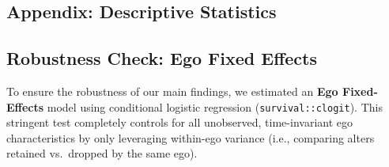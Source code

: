 \documentclass[
  letterpaper,
  DIV=11,
  numbers=noendperiod]{scrartcl}
\begin{document}
\subsection{Appendix: Descriptive
Statistics}\label{appendix-descriptive-statistics}

\subsection{Robustness Check: Ego Fixed
Effects}\label{robustness-check-ego-fixed-effects}

To ensure the robustness of our main findings, we estimated an
\textbf{Ego Fixed-Effects} model using conditional logistic regression
(\texttt{survival::clogit}). This stringent test completely controls for
all unobserved, time-invariant ego characteristics by only leveraging
within-ego variance (i.e., comparing alters retained vs.~dropped by the
same ego).
\end{document}

